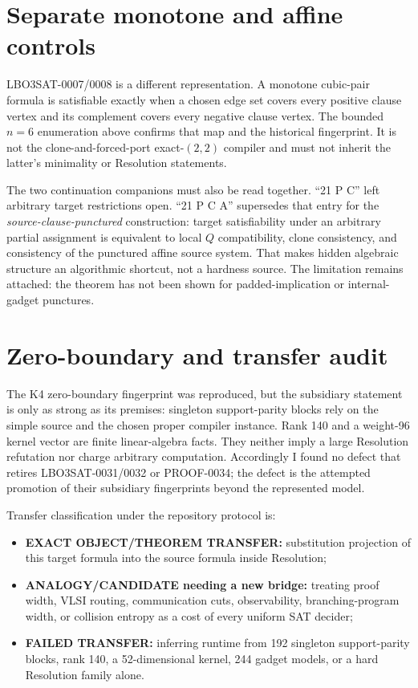 \documentclass[11pt]{article}
\begin{document}
\section{Separate monotone and affine controls}

LBO3SAT-0007/0008 is a different representation.  A monotone cubic-pair
formula is satisfiable exactly when a chosen edge set covers every positive
clause vertex and its complement covers every negative clause vertex.  The
bounded $n=6$ enumeration above confirms that map and the historical
fingerprint.  It is not the clone-and-forced-port exact-$(2,2)$ compiler and
must not inherit the latter's minimality or Resolution statements.

The two continuation companions must also be read together.  ``21 P C'' left
arbitrary target restrictions open.  ``21 P C A'' supersedes that entry for
the \emph{source-clause-punctured} construction: target satisfiability under
an arbitrary partial assignment is equivalent to local $Q$ compatibility,
clone consistency, and consistency of the punctured affine source system.
That makes hidden algebraic structure an algorithmic shortcut, not a hardness
source.  The limitation remains attached: the theorem has not been shown for
padded-implication or internal-gadget punctures.

\section{Zero-boundary and transfer audit}

The K4 zero-boundary fingerprint was reproduced, but the subsidiary statement
is only as strong as its premises: singleton support-parity blocks rely on the
simple source and the chosen proper compiler instance.  Rank 140 and a
weight-96 kernel vector are finite linear-algebra facts.  They neither imply a
large Resolution refutation nor charge arbitrary computation.  Accordingly I
found no defect that retires LBO3SAT-0031/0032 or PROOF-0034; the defect is the
attempted promotion of their subsidiary fingerprints beyond the represented
model.

Transfer classification under the repository protocol is:
\begin{itemize}
  \item \textbf{EXACT OBJECT/THEOREM TRANSFER:} substitution projection of
  this target formula into the source formula inside Resolution;
  \item \textbf{ANALOGY/CANDIDATE needing a new bridge:} treating proof width,
  VLSI routing, communication cuts, observability, branching-program width,
  or collision entropy as a cost of every uniform SAT decider;
  \item \textbf{FAILED TRANSFER:} inferring runtime from 192 singleton
  support-parity blocks, rank 140, a 52-dimensional kernel, 244 gadget models,
  or a hard Resolution family alone.
\end{itemize}
\end{document}
